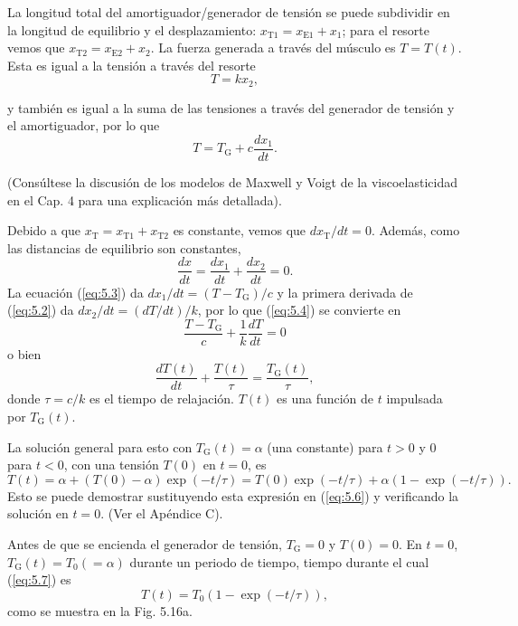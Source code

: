 \documentclass[12pt]{book}
\begin{document}
La longitud total del amortiguador/generador de tensión se puede subdividir en la longitud de equilibrio y el desplazamiento: $x_{\text{T1}} = x_{\text{E1}} + x_1$; para el resorte vemos que $x_{\text{T2}} = x_{\text{E2}} + x_2$. La fuerza generada a través del músculo es $T = T(t)$. Esta es igual a la tensión a través del resorte
\begin{equation}
T = kx_2,
\label{eq:5.2}
\end{equation}

y también es igual a la suma de las tensiones a través del generador de tensión y el amortiguador, por lo que
\begin{equation}
T = T_{\text{G}} + c \frac{dx_1}{dt}.
\label{eq:5.3}
\end{equation}

(Consúltese la discusión de los modelos de Maxwell y Voigt de la viscoelasticidad en el Cap. 4 para una explicación más detallada).

Debido a que $x_{\text{T}} = x_{\text{T1}} + x_{\text{T2}}$ es constante, vemos que $dx_{\text{T}}/dt = 0$. Además, como las distancias de equilibrio son constantes,
\begin{equation}
\frac{dx}{dt} = \frac{dx_1}{dt} + \frac{dx_2}{dt} = 0.
\label{eq:5.4}
\end{equation}
La ecuación (\ref{eq:5.3}) da $dx_1/dt = (T - T_{\text{G}})/c$ y la primera derivada de (\ref{eq:5.2}) da $dx_2/dt = (dT/dt)/k$, por lo que (\ref{eq:5.4}) se convierte en
\begin{equation}
\frac{T - T_{\text{G}}}{c} + \frac{1}{k} \frac{dT}{dt} = 0
\label{eq:5.5}
\end{equation}
o bien
\begin{equation}
\frac{dT(t)}{dt} + \frac{T(t)}{\tau} = \frac{T_{\text{G}}(t)}{\tau},
\label{eq:5.6}
\end{equation}
donde $\tau = c/k$ es el tiempo de relajación. $T(t)$ es una función de $t$ impulsada por $T_{\text{G}}(t)$.

La solución general para esto con $T_{\text{G}}(t) = \alpha$ (una constante) para $t > 0$ y $0$ para $t < 0$, con una tensión $T(0)$ en $t = 0$, es
\begin{equation}
T(t) = \alpha + (T(0) - \alpha) \exp(-t/\tau) = T(0) \exp(-t/\tau) + \alpha(1 - \exp(-t/\tau)).
\label{eq:5.7}
\end{equation}
Esto se puede demostrar sustituyendo esta expresión en (\ref{eq:5.6}) y verificando la solución en $t = 0$. (Ver el Apéndice C).

Antes de que se encienda el generador de tensión, $T_{\text{G}} = 0$ y $T(0) = 0$. En $t = 0$, $T_{\text{G}}(t) = T_0 (= \alpha)$ durante un periodo de tiempo, tiempo durante el cual (\ref{eq:5.7}) es
\begin{equation}
T(t) = T_0(1 - \exp(-t/\tau)),
\label{eq:5.8}
\end{equation}
como se muestra en la Fig. 5.16a.
\end{document}
